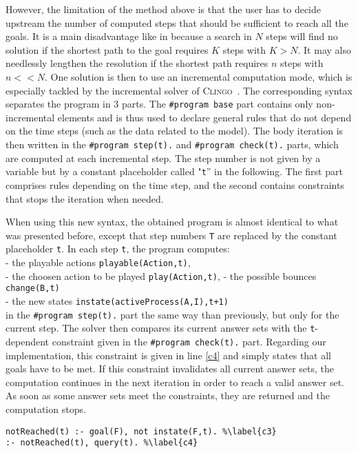 However, the limitation of the method above is that the user has to decide upstream
the number of computed steps that should be sufficient to reach all the goals.
It is a main disadvantage like in \cite{roccaasp} because a search in $N$ steps will find no solution
if the shortest path to the goal requires $K$ steps with $K > N$.
It may also needlessly lengthen the resolution if the shortest path requires $n$ steps with $n << N$.
One solution is then to use an incremental computation mode,
which is especially tackled by the incremental solver of \textsc{Clingo}~\cite{gebser2008user}.
The corresponding syntax separates the program in 3 parts.
The \texttt{\#program base} part contains only non-incremental elements
and is thus used to declare general rules
that do not depend on the time steps (such as the data related to the model).
The body iteration is then written in the
\texttt{\#program step(t).} and \texttt{\#program check(t).} parts,
which are computed at each incremental step. The step number is not given by a variable but by a constant placeholder called "\texttt{t}'' in the following.
The first part comprises rules depending on the time step,
and the second contains constraints that stops the iteration when needed.

When using this new syntax, the obtained program is almost identical
to what was presented before,
except that step numbers \texttt{T}
are replaced by the constant placeholder \texttt{t}.
In each step \texttt{t}, the program computes: \\
  - the playable actions 
   \texttt{playable(Action,t)}, \\
   - the choosen action to be played \texttt{play(Action,t)},
  - the possible bounces \texttt{change(B,t)} \\
  - the new states \texttt{instate(activeProcess(A,I),t+1)}\\

in the \texttt{\#program step(t).} part
the same way than previously, but only for the current step.
The solver then compares its current answer sets with
the \texttt{t}-dependent constraint given in the \texttt{\#program check(t).} part.
Regarding our implementation, this constraint is given in line \ref{c4}
and simply states that all goals have to be met.
If this constraint invalidates all current answer sets,
the computation continues in the next iteration in order to reach a valid answer set.
As soon as some answer sets meet the constraints,
they are returned and the computation stops.
\begin{lstlisting}
notReached(t) :- goal(F), not instate(F,t). %\label{c3}
:- notReached(t), query(t). %\label{c4}
\end{lstlisting}
